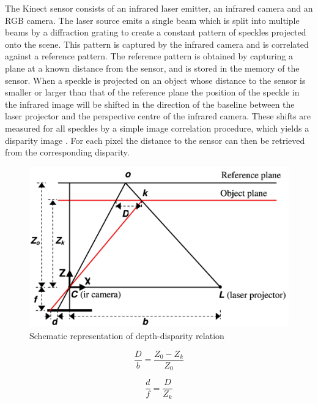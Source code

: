 The Kinect sensor consists of an infrared laser emitter, an 
infrared camera and an RGB camera. The laser source emits a single 
beam which is split into multiple beams by a diffraction 
grating to create a constant 
pattern of speckles projected onto the scene. This pattern is 
captured by the infrared camera and is correlated against a 
reference pattern. The reference pattern is obtained by capturing 
a plane at a known distance from the sensor, and is stored in the 
memory of the sensor. When a speckle is projected on an object 
whose distance to the sensor is smaller or larger than that of the 
reference plane the position of the speckle in the infrared image 
will be shifted in the direction of the baseline between the laser 
projector and the perspective centre of the infrared camera. 
These shifts are measured for all speckles by a simple image 
correlation procedure, which yields a disparity image \cite{khoshelham2011accuracy} . For each 
pixel the distance to the sensor can then be retrieved from the 
corresponding disparity.



\begin{figure}[h!]
\begin{center}
\includegraphics[scale=1]{images/kinect_triangulation}
\caption{Schematic representation of depth-disparity relation \cite{khoshelham2011accuracy}}
\label{fig:disparity}
\end{center}
\end{figure}

\begin{equation}
\label{eq:disparity1}
 \frac{D}{b} = \frac{Z_0 - Z_k}{Z_0} 
\end{equation}


\begin{equation}
\label{eq:disparity2}
 \frac{d}{f} = \frac{D}{Z_k} 
\end{equation}


